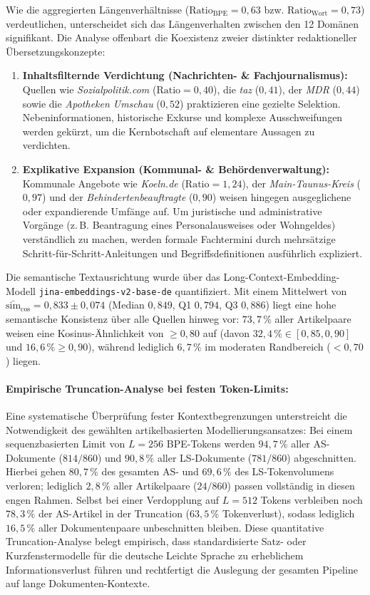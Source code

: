 Wie die aggregierten Längenverhältnisse ($\text{Ratio}_{\text{BPE}} = 0{,}63$ bzw. $\text{Ratio}_{\text{Wort}} = 0{,}73$) verdeutlichen, unterscheidet sich das Längenverhalten zwischen den 12 Domänen signifikant. Die Analyse offenbart die Koexistenz zweier distinkter redaktioneller Übersetzungskonzepte:
\begin{enumerate}
    \item \textbf{Inhaltsfilternde Verdichtung (Nachrichten- \& Fachjournalismus):} Quellen wie \textit{Sozialpolitik.com} ($\text{Ratio} = 0{,}40$), die \textit{taz} ($0{,}41$), der \textit{MDR} ($0{,}44$) sowie die \textit{Apotheken Umschau} ($0{,}52$) praktizieren eine gezielte Selektion. Nebeninformationen, historische Exkurse und komplexe Ausschweifungen werden gekürzt, um die Kernbotschaft auf elementare Aussagen zu verdichten.
    \item \textbf{Explikative Expansion (Kommunal- \& Behördenverwaltung):} Kommunale Angebote wie \textit{Koeln.de} ($\text{Ratio} = 1{,}24$), der \textit{Main-Taunus-Kreis} ($0{,}97$) und der \textit{Behindertenbeauftragte} ($0{,}90$) weisen hingegen ausgeglichene oder expandierende Umfänge auf. Um juristische und administrative Vorgänge (z.\,B. Beantragung eines Personalausweises oder Wohngeldes) verständlich zu machen, werden formale Fachtermini durch mehrsätzige Schritt-für-Schritt-Anleitungen und Begriffsdefinitionen ausführlich expliziert.
\end{enumerate}

Die semantische Textausrichtung wurde über das Long-Context-Embedding-Modell \texttt{jina-embeddings-v2-base-de} quantifiziert. Mit einem Mittelwert von $\bar{\text{sim}}_{\cos} = 0{,}833 \pm 0{,}074$ (Median $0{,}849$, Q1 $0{,}794$, Q3 $0{,}886$) liegt eine hohe semantische Konsistenz über alle Quellen hinweg vor: $73{,}7\,\%$ aller Artikelpaare weisen eine Kosinus-Ähnlichkeit von $\ge 0{,}80$ auf (davon $32{,}4\,\% \in [0{,}85, 0{,}90]$ und $16{,}6\,\% \ge 0{,}90$), während lediglich $6{,}7\,\%$ im moderaten Randbereich ($< 0{,}70$) liegen.

\paragraph{Empirische Truncation-Analyse bei festen Token-Limits:}
Eine systematische Überprüfung fester Kontextbegrenzungen unterstreicht die Notwendigkeit des gewählten artikelbasierten Modellierungsansatzes: Bei einem sequenzbasierten Limit von $L = 256$ BPE-Tokens werden $94{,}7\,\%$ aller AS-Dokumente ($814/860$) und $90{,}8\,\%$ aller LS-Dokumente ($781/860$) abgeschnitten. Hierbei gehen $80{,}7\,\%$ des gesamten AS- und $69{,}6\,\%$ des LS-Tokenvolumens verloren; lediglich $2{,}8\,\%$ aller Artikelpaare ($24/860$) passen vollständig in diesen engen Rahmen. Selbst bei einer Verdopplung auf $L = 512$ Tokens verbleiben noch $78{,}3\,\%$ der AS-Artikel in der Truncation ($63{,}5\,\%$ Tokenverlust), sodass lediglich $16{,}5\,\%$ aller Dokumentenpaare unbeschnitten bleiben. Diese quantitative Truncation-Analyse belegt empirisch, dass standardisierte Satz- oder Kurzfenstermodelle für die deutsche Leichte Sprache zu erheblichem Informationsverlust führen und rechtfertigt die Auslegung der gesamten Pipeline auf lange Dokumenten-Kontexte.

